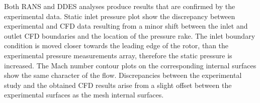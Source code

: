 %

Both RANS and DDES analyses produce results that are confirmed by the experimental data. Static inlet pressure plot show the discrepancy between experimental and CFD data resulting from a minor shift between the inlet and outlet CFD boundaries and the location of the pressure rake. The inlet boundary condition is moved closer towards the leading edge of the rotor, than the experimental pressure measurements array, therefore the static pressure is increased. The Mach number contour plots on the corresponding internal surfaces show the same character of the flow. Discrepancies between the experimental study and the obtained CFD results arise from a slight offset between the experimental surfaces as the mesh internal surfaces. 
